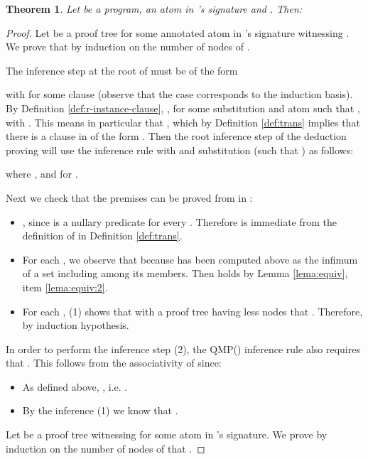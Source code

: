 \documentclass{sigplanconf}
\theoremstyle{definition}
\theoremstyle{plain}
\newtheorem{theorem}{Theorem}
\begin{document}
\begin{theorem} \label{th:equivalence}
Let  be a  program,   an atom in 's signature and . Then:

\end{theorem}

\begin{proof}
Let  be a  proof tree for some annotated atom  in 's signature witnessing . We prove that  by induction on the number of nodes of .

The inference step at the root of   must be of the form

with  for some clause  (observe that the case  corresponds to the induction basis). By Definition \ref{def:r-instance-clause}, ,  for some substitution  and atom  such that  , with . This means in particular that , which by Definition \ref{def:trans} implies that  there is a clause  in  of the form . Then the root inference step of the deduction proving  will use the inference rule  with  and substitution  (such that ) as follows:

where , and  for .

Next we check that the premises can be proved from  in :
\begin{itemize}
    \item , since  is a nullary predicate for every . Therefore  is immediate from the definition of  in Definition \ref{def:trans}.

    \item For each , we observe that  because  has been computed above as the infimum of a set including  among its members. Then  holds by Lemma \ref{lema:equiv}, item \ref{lema:equiv:2}.

    \item For each , (1) shows that  with a proof tree having less nodes that . Therefore,  by induction hypothesis.
\end{itemize}

In order to perform the inference step (2), the QMP() inference rule also requires that . This follows from the associativity of  since:
\begin{itemize}
    \item As defined above,  , i.e.  .
    \item By the   inference (1) we know that .
\end{itemize}
\medskip

Let  be a  proof tree witnessing    for some atom  in 's signature.  We prove by induction on the number of nodes of  that .


\end{proof}
\end{document}
